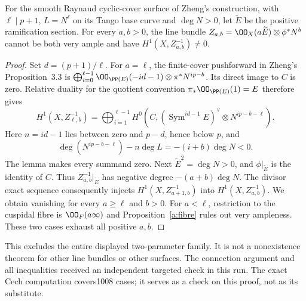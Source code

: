 \begin{proposition}[A3R; Proved]\label{a:raynaud-all}
For the smooth Raynaud cyclic-cover surface of Zheng's construction,
with $\ell\mid p+1$, $L=N^\ell$ on its Tango base curve and
$\deg N>0$, let $\widetilde E$ be the positive ramification section.
For every $a,b>0$, the line bundle
$Z_{a,b}=\OO_X(a\widetilde E)\otimes\phi^*N^b$ cannot be both very
ample and have $H^1(X,Z_{a,b}^{-1})\ne0$.
\end{proposition}
\begin{proof}
Set $d=(p+1)/\ell$. For $a=\ell$, the finite-cover pushforward in
Zheng's Proposition~3.3 is
$\bigoplus_{i=0}^{\ell-1}\OO_{\PP(E)}(-id-1)\otimes\pi^*N^{ip-b}$.
Its direct image to $C$ is zero. Relative duality for the quotient
convention $\pi_*\OO_{\PP(E)}(1)=E$ therefore gives
\[
 H^1(X,Z_{\ell,b}^{-1})=
 \bigoplus_{i=1}^{\ell-1}
 H^0\!\left(C,(\operatorname{Sym}^{id-1}E)^\vee
                         \otimes N^{ip-b-\ell}\right).
\]
Here $n=id-1$ lies between zero and $p-d$, hence below $p$, and
\[
 \deg(N^{ip-b-\ell})-n\deg L=-(i+b)\deg N<0.
\]
The lemma makes every summand zero.
Next $\widetilde E^2=\deg N>0$, and $\phi|_{\widetilde E}$ is the
identity of $C$. Thus $Z_{a,b}^{-1}|_{\widetilde E}$ has negative
degree $-(a+b)\deg N$. The divisor exact sequence consequently
injects $H^1(X,Z_{a+1,b}^{-1})$ into $H^1(X,Z_{a,b}^{-1})$.
We obtain vanishing for every $a\geq\ell$ and $b>0$.
For $a<\ell$, restriction to the cuspidal fibre is
$\OO_F(a\infty)$ and Proposition~\ref{a:fibre} rules out very
ampleness. These two cases exhaust all positive $a,b$.
\end{proof}

This excludes the entire displayed two-parameter family. It is not a
nonexistence theorem for other line bundles or other surfaces.
The connection argument and all inequalities received an independent
targeted check in this run. The exact Cech computation covers1008 cases;
it serves as a check on this proof, not as its substitute.
